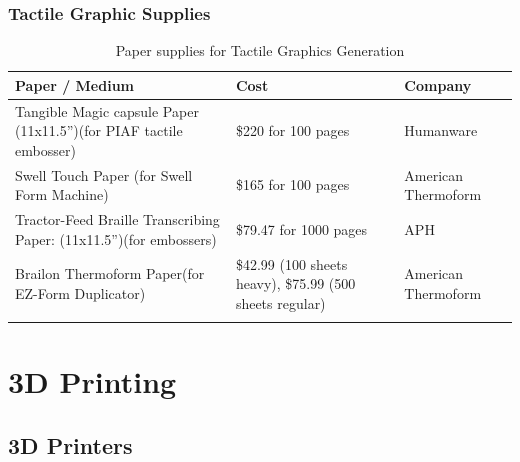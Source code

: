 \documentclass[14pt, letterpaper,twoside]{extreport}
\begin{document}
\hypertarget{tactile-paper}{%
\subsection*{Tactile Graphic Supplies}\label{tactile-paper}}


\begin{longtable}[]{@{}
 >{\raggedright\arraybackslash}p{}
 >{\raggedright\arraybackslash}p{}
 >{\raggedright\arraybackslash}p{}@{}
 }
\toprule\noalign{}

\textbf{Paper / Medium} & \textbf{Cost} & \textbf{Company} \\
\midrule\noalign{}
\endhead
\bottomrule\noalign{}
\endlastfoot
Tangible Magic capsule Paper (11x11.5'')\break(for PIAF tactile embosser) & \$220 for 100 pages & Humanware \\[1.0em]
Swell Touch Paper \break (for Swell Form Machine) & \$165 for 100 pages & American Thermoform \\[1.0em]
Tractor-Feed Braille Transcribing Paper: (11x11.5'')\break (for embossers) & \$79.47 for 1000 pages & APH \\[1.0em]
Brailon Thermoform Paper\break (for EZ-Form Duplicator) & \$42.99 (100 sheets heavy), \$75.99 (500 sheets regular) & American Thermoform \\[1.0em]\hline
\caption{ Paper supplies for Tactile Graphics Generation }
\end{longtable}


\pagebreak \hypertarget{d-printers}{%
\chapter*{3D Printing}\label{d-printers}}
\pagebreak \hypertarget{d-print-equipment}{%
\section*{3D Printers}\label{d-print-equipment}}

\end{document}
